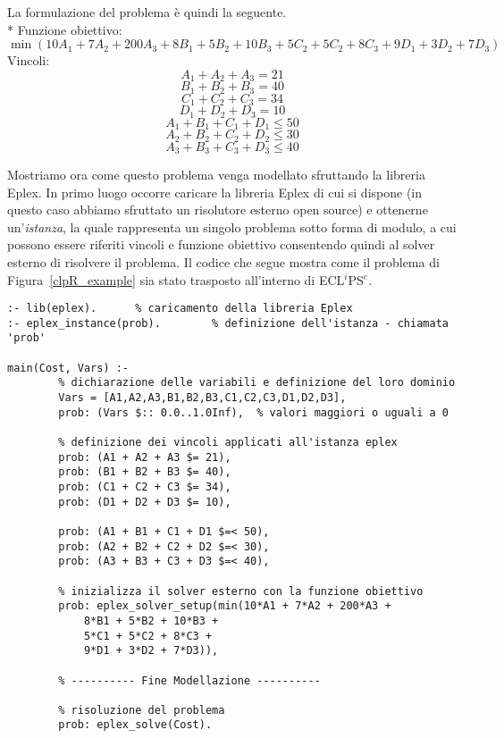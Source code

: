 \documentclass[12pt,a4paper,openright,twoside]{report}
\begin{document}
La formulazione del problema è quindi la seguente.\\*
Funzione obiettivo: 
\begin{equation}  \label{exampleClpRObiett}
	\min(10A_1+7A_2+200A_3+8B_1+5B_2+10B_3+5C_2+5C_2+8C_3+9D_1+3D_2+7D_3)
\end{equation}
Vincoli:
\begin{equation}  \label{exampleCons1}
	A_1+A_2+A_3=21
\end{equation}
\begin{equation}  \label{exampleCons2}
	B_1+B_2+B_3=40
\end{equation}
\begin{equation}  \label{exampleCons3}
	C_1+C_2+C_3=34
\end{equation}
\begin{equation}  \label{exampleCons4}
	D_1+D_2+D_3=10
\end{equation}
\begin{equation}  \label{exampleCons5}
	A_1+B_1+C_1+D_1 \leq 50
\end{equation}
\begin{equation}  \label{exampleCons6}
	A_2+B_2+C_2+D_2 \leq 30
\end{equation}
\begin{equation}  \label{exampleCons7}
	A_3+B_3+C_3+D_3 \leq 40
\end{equation}

Mostriamo ora come questo problema venga modellato sfruttando la libreria Eplex. In primo luogo occorre caricare la libreria Eplex di cui si dispone (in questo caso abbiamo sfruttato un risolutore esterno open source) e ottenerne un'\emph{istanza}, la quale rappresenta un singolo problema sotto forma di modulo, a cui possono essere riferiti vincoli e funzione obiettivo consentendo quindi al solver esterno di risolvere il problema. Il codice che segue mostra come il problema di Figura~\ref{clpR_example} sia stato trasposto all'interno di ECL$^i$PS$^e$.

\begin{lstlisting}
:- lib(eplex).		% caricamento della libreria Eplex
:- eplex_instance(prob).		% definizione dell'istanza - chiamata 'prob'

main(Cost, Vars) :-
		% dichiarazione delle variabili e definizione del loro dominio		
		Vars = [A1,A2,A3,B1,B2,B3,C1,C2,C3,D1,D2,D3],
		prob: (Vars $:: 0.0..1.0Inf),  % valori maggiori o uguali a 0
		
		% definizione dei vincoli applicati all'istanza eplex
		prob: (A1 + A2 + A3 $= 21), 
		prob: (B1 + B2 + B3 $= 40),
		prob: (C1 + C2 + C3 $= 34),
		prob: (D1 + D2 + D3 $= 10),

		prob: (A1 + B1 + C1 + D1 $=< 50),
		prob: (A2 + B2 + C2 + D2 $=< 30),
		prob: (A3 + B3 + C3 + D3 $=< 40),

		% inizializza il solver esterno con la funzione obiettivo
		prob: eplex_solver_setup(min(10*A1 + 7*A2 + 200*A3 + 
			8*B1 + 5*B2 + 10*B3 +
		 	5*C1 + 5*C2 + 8*C3 +
		 	9*D1 + 3*D2 + 7*D3)),

		% ---------- Fine Modellazione ----------

		% risoluzione del problema
		prob: eplex_solve(Cost).
\end{lstlisting}
\end{document}

